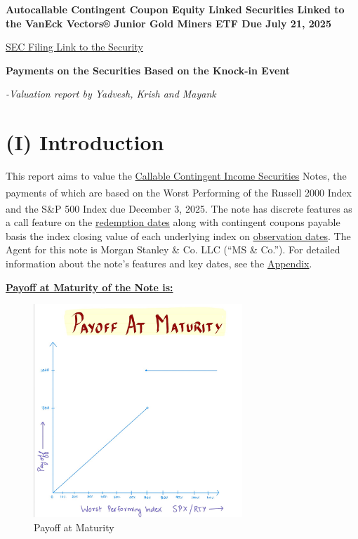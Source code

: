 \documentclass[12pt,a4paper]{article}
\begin{document}
\begin{center}
{\color{americanblue}\Large\textbf{Autocallable Contingent Coupon Equity Linked Securities Linked to the VanEck Vectors® Junior Gold Miners ETF Due July 21, 2025}}

\vspace{0.2cm}
{\color{americanblue}\large\href{https://www.sec.gov/Archives/edgar/data/200245/000148105724000574/form424b2.htm}{SEC Filing Link to the Security}}

\vspace{0.2cm}
{\color{americanblue}\Large\textbf{Payments on the Securities Based on the Knock-in Event}}

\vspace{0.2cm}
{\small{\it -Valuation report by Yadvesh, Krish and Mayank}}
\end{center}

\vspace{1ex}

\section*{(I) Introduction}

This report aims to value the  \underline{Callable Contingent Income Securities} Notes, the payments of which are based on the Worst Performing of the Russell 2000\textsuperscript{\textregistered} Index and the S\&P 500\textsuperscript{\textregistered} Index due December 3, 2025. The note has discrete features as a call feature on the \hyperref[app:dates]{redemption dates} along with contingent coupons payable basis the index closing value of each underlying index on \hyperref[app:dates]{observation dates}. The Agent for this note is Morgan Stanley \& Co. LLC (“MS \& Co.”). For detailed information about the note's features and key dates, see the \hyperref[app:keydates]{Appendix}.

\vspace{0.5cm}


\underline{\textbf{Payoff at Maturity of the Note is:}}
\begin{figure}[H]
    \centering
    \includegraphics[width=0.7\textwidth, height=0.4\textheight]{images_project_3/payoff_project_2.png}
    \caption{Payoff at Maturity}
    \label{fig:yourlabel}
\end{figure}
\end{document}

